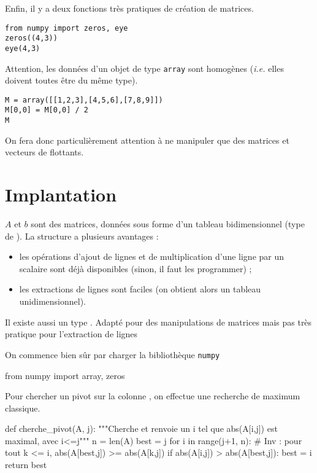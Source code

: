 Enfin, il y a deux fonctions très pratiques de création de matrices.
\begin{lstlisting}
from numpy import zeros, eye
zeros((4,3))
eye(4,3)
\end{lstlisting}

\begin{rem}
Attention, les données d'un objet de type \texttt{array} sont homogènes (\emph{i.e.} elles doivent toutes être du même type).
\begin{lstlisting}
M = array([[1,2,3],[4,5,6],[7,8,9]])
M[0,0] = M[0,0] / 2
M
\end{lstlisting}
On fera donc particulièrement attention à ne manipuler que des matrices et vecteurs de flottants. 
\end{rem}


\section{Implantation}

$A$ et $b$ sont des matrices, données sous forme d'un tableau bidimensionnel
(type  de ). La structure  a plusieurs avantages : 
\begin{itemize}
\item les opérations d'ajout de lignes et de multiplication d'une ligne par un
scalaire sont déjà disponibles (sinon, il faut les programmer) ;
\item les extractions de lignes sont faciles (on obtient alors un tableau unidimensionnel).
\end{itemize}

\begin{rem}
  Il existe aussi un type . Adapté pour des
manipulations de matrices mais pas très pratique pour l'extraction de
lignes
\end{rem}


On commence bien sûr par charger la bibliothèque \texttt{numpy}
\begin{pyverbatim}
from numpy import array, zeros
\end{pyverbatim}

\medskip{}

Pour chercher un pivot sur la colonne , on effectue une recherche de maximum classique.
\begin{pyverbatim}
def cherche_pivot(A, j):
    """Cherche et renvoie un i tel que abs(A[i,j]) est maximal, avec i<=j"""
    n = len(A)
    best = j
    for i in range(j+1, n):
        # Inv : pour tout k <= i, abs(A[best,j]) >= abs(A[k,j])
        if abs(A[i,j]) > abs(A[best,j]):
            best = i
    return best
\end{pyverbatim}


